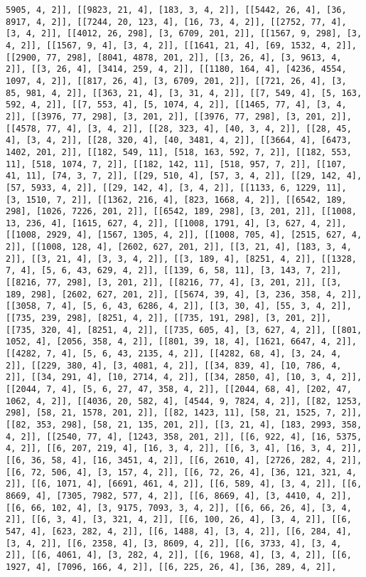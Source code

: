 \documentclass[12pt,fleqn]{article}\usepackage{../../common}
\begin{document}
\begin{verbatim}
5905, 4, 2]], [[9823, 21, 4], [183, 3, 4, 2]], [[5442, 26, 4], [36, 8917, 4, 2]], [[7244, 20, 123, 4], [16, 73, 4, 2]], [[2752, 77, 4], [3, 4, 2]], [[4012, 26, 298], [3, 6709, 201, 2]], [[1567, 9, 298], [3, 4, 2]], [[1567, 9, 4], [3, 4, 2]], [[1641, 21, 4], [69, 1532, 4, 2]], [[2900, 77, 298], [8041, 4878, 201, 2]], [[3, 26, 4], [3, 9613, 4, 2]], [[3, 26, 4], [3414, 259, 4, 2]], [[1180, 164, 4], [4236, 4554, 1097, 4, 2]], [[817, 26, 4], [3, 6709, 201, 2]], [[721, 26, 4], [3, 85, 981, 4, 2]], [[363, 21, 4], [3, 31, 4, 2]], [[7, 549, 4], [5, 163, 592, 4, 2]], [[7, 553, 4], [5, 1074, 4, 2]], [[1465, 77, 4], [3, 4, 2]], [[3976, 77, 298], [3, 201, 2]], [[3976, 77, 298], [3, 201, 2]], [[4578, 77, 4], [3, 4, 2]], [[28, 323, 4], [40, 3, 4, 2]], [[28, 45, 4], [3, 4, 2]], [[28, 320, 4], [40, 3481, 4, 2]], [[3664, 4], [6473, 1402, 201, 2]], [[182, 549, 11], [518, 163, 592, 7, 2]], [[182, 553, 11], [518, 1074, 7, 2]], [[182, 142, 11], [518, 957, 7, 2]], [[107, 41, 11], [74, 3, 7, 2]], [[29, 510, 4], [57, 3, 4, 2]], [[29, 142, 4], [57, 5933, 4, 2]], [[29, 142, 4], [3, 4, 2]], [[1133, 6, 1229, 11], [3, 1510, 7, 2]], [[1362, 216, 4], [823, 1668, 4, 2]], [[6542, 189, 298], [1026, 7226, 201, 2]], [[6542, 189, 298], [3, 201, 2]], [[1008, 13, 236, 4], [1615, 627, 4, 2]], [[1008, 1791, 4], [3, 627, 4, 2]], [[1008, 2929, 4], [1567, 1305, 4, 2]], [[1008, 705, 4], [2515, 627, 4, 2]], [[1008, 128, 4], [2602, 627, 201, 2]], [[3, 21, 4], [183, 3, 4, 2]], [[3, 21, 4], [3, 3, 4, 2]], [[3, 189, 4], [8251, 4, 2]], [[1328, 7, 4], [5, 6, 43, 629, 4, 2]], [[139, 6, 58, 11], [3, 143, 7, 2]], [[8216, 77, 298], [3, 201, 2]], [[8216, 77, 4], [3, 201, 2]], [[3, 189, 298], [2602, 627, 201, 2]], [[5674, 39, 4], [3, 236, 358, 4, 2]], [[3058, 7, 4], [5, 6, 43, 6286, 4, 2]], [[3, 30, 4], [55, 3, 4, 2]], [[735, 239, 298], [8251, 4, 2]], [[735, 191, 298], [3, 201, 2]], [[735, 320, 4], [8251, 4, 2]], [[735, 605, 4], [3, 627, 4, 2]], [[801, 1052, 4], [2056, 358, 4, 2]], [[801, 39, 18, 4], [1621, 6647, 4, 2]], [[4282, 7, 4], [5, 6, 43, 2135, 4, 2]], [[4282, 68, 4], [3, 24, 4, 2]], [[229, 380, 4], [3, 4081, 4, 2]], [[34, 839, 4], [10, 786, 4, 2]], [[34, 291, 4], [10, 2714, 4, 2]], [[34, 2850, 4], [10, 3, 4, 2]], [[2044, 7, 4], [5, 6, 27, 47, 358, 4, 2]], [[2044, 68, 4], [202, 47, 1062, 4, 2]], [[4036, 20, 582, 4], [4544, 9, 7824, 4, 2]], [[82, 1253, 298], [58, 21, 1578, 201, 2]], [[82, 1423, 11], [58, 21, 1525, 7, 2]], [[82, 353, 298], [58, 21, 135, 201, 2]], [[3, 21, 4], [183, 2993, 358, 4, 2]], [[2540, 77, 4], [1243, 358, 201, 2]], [[6, 922, 4], [16, 5375, 4, 2]], [[6, 207, 219, 4], [16, 3, 4, 2]], [[6, 3, 4], [16, 3, 4, 2]], [[6, 36, 58, 4], [16, 3451, 4, 2]], [[6, 2610, 4], [2726, 282, 4, 2]], [[6, 72, 506, 4], [3, 157, 4, 2]], [[6, 72, 26, 4], [36, 121, 321, 4, 2]], [[6, 1071, 4], [6691, 461, 4, 2]], [[6, 589, 4], [3, 4, 2]], [[6, 8669, 4], [7305, 7982, 577, 4, 2]], [[6, 8669, 4], [3, 4410, 4, 2]], [[6, 66, 102, 4], [3, 9175, 7093, 3, 4, 2]], [[6, 66, 26, 4], [3, 4, 2]], [[6, 3, 4], [3, 321, 4, 2]], [[6, 100, 26, 4], [3, 4, 2]], [[6, 547, 4], [623, 282, 4, 2]], [[6, 1488, 4], [3, 4, 2]], [[6, 284, 4], [3, 4, 2]], [[6, 2358, 4], [3, 8609, 4, 2]], [[6, 3733, 4], [3, 4, 2]], [[6, 4061, 4], [3, 282, 4, 2]], [[6, 1968, 4], [3, 4, 2]], [[6, 1927, 4], [7096, 166, 4, 2]], [[6, 225, 26, 4], [36, 289, 4, 2]], 
\end{verbatim}
\end{document}
